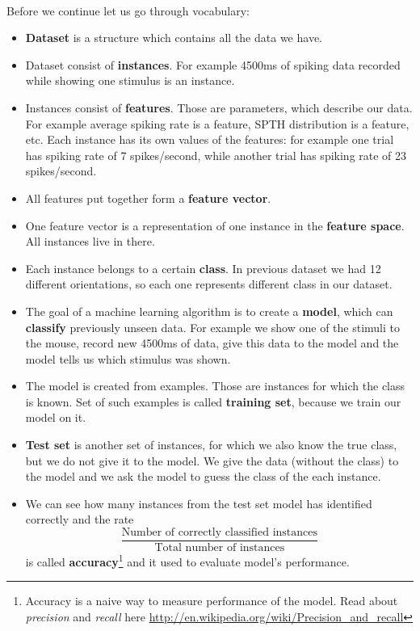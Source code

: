 \documentclass[a4paper,11pt]{article}
\begin{document}
%
%
\ \\
Before we continue let us go through vocabulary:
\begin{itemize}
\itemsep 0em
	\item \textbf{Dataset} is a structure which contains all the data we have.
	\item Dataset consist of \textbf{instances}. For example 4500ms of spiking data recorded while showing one stimulus is an instance.
	\item Instances consist of \textbf{features}. Those are parameters, which describe our data. For example average spiking rate is a feature, SPTH distribution is a feature, etc. Each instance has its own values of the features: for example one trial has spiking rate of 7 spikes/second, while another trial has spiking rate of 23 spikes/second.
	\item All features put together form a \textbf{feature vector}.
	\item One feature vector is a representation of one instance in the \textbf{feature space}. All instances live in there.
	\item Each instance belongs to a certain \textbf{class}. In previous dataset we had 12 different orientations, so each one represents different class in our dataset.
	\item The goal of a machine learning algorithm is to create a \textbf{model}, which can \textbf{classify} previously unseen data. For example we show one of the stimuli to the mouse, record new 4500ms of data, give this data to the model and the model tells us which stimulus was shown.
	\item The model is created from examples. Those are instances for which the class is known. Set of such examples is called \textbf{training set}, because we train our model on it.
	\item \textbf{Test set} is another set of instances, for which we also know the true class, but we do not give it to the model. We give the data (without the class) to the model and we ask the model to guess the class of the each instance.
	\item We can see how many instances from the test set model has identified correctly and the rate $$\displaystyle\frac{\text{Number of correctly classified instances}}{\text{Total number of instances}}$$ is called \textbf{accuracy}\footnote{Accuracy is a naive way to measure performance of the model. Read about \emph{precision} and \emph{recall} here \url{http://en.wikipedia.org/wiki/Precision_and_recall}} and it used to evaluate model's performance.
\end{itemize}
\end{document}
